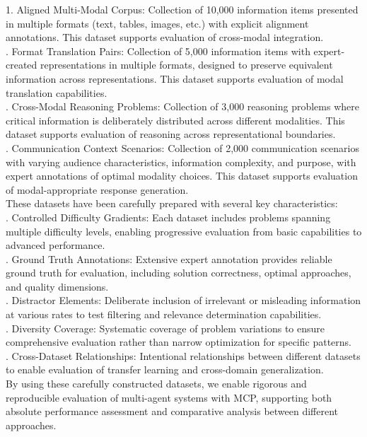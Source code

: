 1. Aligned Multi-Modal Corpus: Collection of 10,000 information items presented in multiple formats (text, tables, images, etc.) with explicit alignment annotations. This dataset supports evaluation of cross-modal integration.\\ . Format Translation Pairs: Collection of 5,000 information items with expert-created representations in multiple formats, designed to preserve equivalent information across representations. This dataset supports evaluation of modal translation capabilities.\\ . Cross-Modal Reasoning Problems: Collection of 3,000 reasoning problems where critical information is deliberately distributed across different modalities. This dataset supports evaluation of reasoning across representational boundaries.\\ . Communication Context Scenarios: Collection of 2,000 communication scenarios with varying audience characteristics, information complexity, and purpose, with expert annotations of optimal modality choices. This dataset supports evaluation of modal-appropriate response generation.\\ \newline
These datasets have been carefully prepared with several key characteristics:\\ . Controlled Difficulty Gradients: Each dataset includes problems spanning multiple difficulty levels, enabling progressive evaluation from basic capabilities to advanced performance.\\ . Ground Truth Annotations: Extensive expert annotation provides reliable ground truth for evaluation, including solution correctness, optimal approaches, and quality dimensions.\\ . Distractor Elements: Deliberate inclusion of irrelevant or misleading information at various rates to test filtering and relevance determination capabilities.\\ . Diversity Coverage: Systematic coverage of problem variations to ensure comprehensive evaluation rather than narrow optimization for specific patterns.\\ . Cross-Dataset Relationships: Intentional relationships between different datasets to enable evaluation of transfer learning and cross-domain generalization.\\ \newline
By using these carefully constructed datasets, we enable rigorous and reproducible evaluation of multi-agent systems with MCP, supporting both absolute performance assessment and comparative analysis between different approaches.\\
